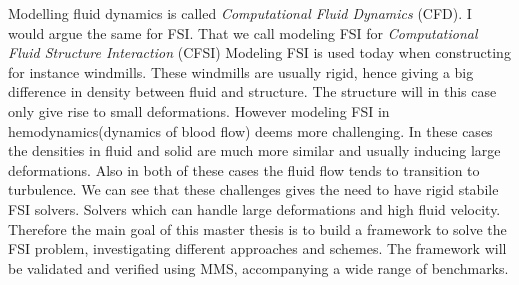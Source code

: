 Modelling fluid dynamics is called \textit{Computational Fluid Dynamics} (CFD). I would argue the same for FSI. That we call modeling FSI for \textit{Computational Fluid Structure Interaction} (CFSI)
Modeling FSI is used today when constructing for instance windmills. These windmills are usually rigid, hence giving a big difference in density between fluid and structure. The structure will in this case only give rise to small deformations. However modeling FSI in hemodynamics(dynamics of blood flow) deems more challenging. In these cases the densities in fluid and solid are much more similar and usually inducing large deformations. Also in both of these cases the fluid flow tends to transition to turbulence. We can see that these challenges gives the need to have rigid stabile FSI solvers. Solvers which can handle large deformations and high fluid velocity. 
Therefore the main goal of this master thesis is to build a framework to solve the FSI problem, investigating different approaches and schemes. The framework will be validated and verified using MMS, accompanying a wide range of benchmarks.  

